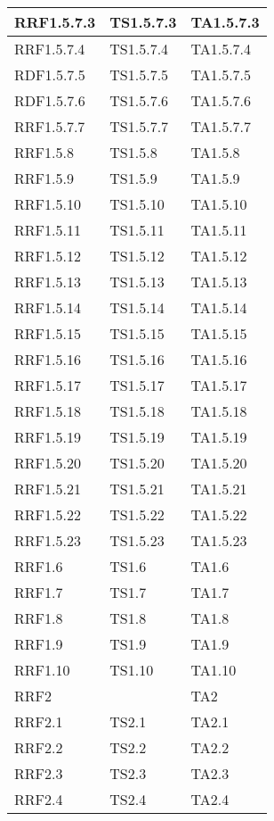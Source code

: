 \begin{longtabu}{| X | X | X |}
				RRF1.5.7.3 	&	TS1.5.7.3 	&	TA1.5.7.3 	\\ \hline
				RRF1.5.7.4 	&	TS1.5.7.4 	&	TA1.5.7.4 	\\ \hline
				RDF1.5.7.5 	&	TS1.5.7.5 	&	TA1.5.7.5 	\\ \hline
				RDF1.5.7.6 	&	TS1.5.7.6 	&	TA1.5.7.6 	\\ \hline
				RRF1.5.7.7 	&	TS1.5.7.7 	&	TA1.5.7.7 	\\ \hline
				RRF1.5.8 	&	TS1.5.8 	&	TA1.5.8 	\\ \hline
				RRF1.5.9 	&	TS1.5.9 	&	TA1.5.9 	\\ \hline
				RRF1.5.10 	&	TS1.5.10 	&	TA1.5.10 	\\ \hline
				RRF1.5.11 	&	TS1.5.11 	&	TA1.5.11 	\\ \hline
				RRF1.5.12 	&	TS1.5.12 	&	TA1.5.12 	\\ \hline
				RRF1.5.13 	&	TS1.5.13 	&	TA1.5.13 	\\ \hline
				RRF1.5.14 	&	TS1.5.14 	&	TA1.5.14 	\\ \hline
				RRF1.5.15 	&	TS1.5.15 	&	TA1.5.15 	\\ \hline
				RRF1.5.16 	&	TS1.5.16 	&	TA1.5.16 	\\ \hline
				RRF1.5.17 	&	TS1.5.17 	&	TA1.5.17 	\\ \hline
				RRF1.5.18 	&	TS1.5.18 	&	TA1.5.18 	\\ \hline
				RRF1.5.19 	&	TS1.5.19 	&	TA1.5.19 	\\ \hline
				RRF1.5.20 	&	TS1.5.20 	&	TA1.5.20 	\\ \hline
				RRF1.5.21 	&	TS1.5.21 	&	TA1.5.21 	\\ \hline
				RRF1.5.22 	&	TS1.5.22 	&	TA1.5.22 	\\ \hline
				RRF1.5.23 	&	TS1.5.23 	&	TA1.5.23 	\\ \hline
				RRF1.6 	&	TS1.6 	&	TA1.6 	\\ \hline
				RRF1.7 	&	TS1.7 	&	TA1.7 	\\ \hline
				RRF1.8 	&	TS1.8 	&	TA1.8 	\\ \hline
				RRF1.9 	&	TS1.9 	&	TA1.9 	\\ \hline
				RRF1.10 	&	TS1.10 	&	TA1.10 	\\ \hline
				RRF2 	&		&	TA2 	\\ \hline
				RRF2.1 	&	TS2.1 	&	TA2.1 	\\ \hline
				RRF2.2 	&	TS2.2 	&	TA2.2 	\\ \hline
				RRF2.3 	&	TS2.3 	&	TA2.3 	\\ \hline
				RRF2.4 	&	TS2.4 	&	TA2.4 	\\ \hline

\end{longtabu}
